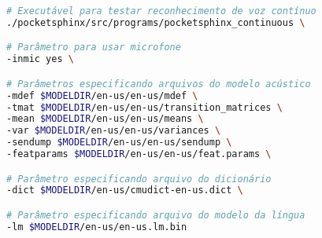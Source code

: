 \begin{enumerate}
\begin{lstlisting}[language=Bash, caption={Teste de reconhecimento de voz contínuo usando Pocketsphinx}, label={sphinxTest}]
# Executável para testar reconhecimento de voz contínuo
./pocketsphinx/src/programs/pocketsphinx_continuous \

# Parâmetro para usar microfone
-inmic yes \

# Parâmetros especificando arquivos do modelo acústico
-mdef $MODELDIR/en-us/en-us/mdef \
-tmat $MODELDIR/en-us/en-us/transition_matrices \
-mean $MODELDIR/en-us/en-us/means \
-var $MODELDIR/en-us/en-us/variances \
-sendump $MODELDIR/en-us/en-us/sendump \
-featparams $MODELDIR/en-us/en-us/feat.params \

# Parâmetro especificando arquivo do dicionário
-dict $MODELDIR/en-us/cmudict-en-us.dict \

# Parâmetro especificando arquivo do modelo da língua
-lm $MODELDIR/en-us/en-us.lm.bin
\end{lstlisting}

\end{enumerate}
